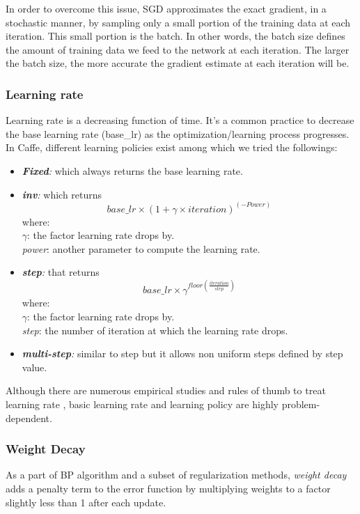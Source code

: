 \indent In order to overcome this issue, SGD approximates the exact gradient, in a stochastic manner, by sampling only a small portion of the training data at each iteration. This small portion is the batch. In other words, the batch size defines the amount of training data we feed to the network at each iteration. The larger the batch size, the more accurate the gradient estimate at each iteration will be. 

\subsubsection{Learning rate}
\label{learning rate}
Learning rate is a decreasing function of time. It's a common practice to decrease the base learning rate (base\_lr) as the optimization/learning process progresses. In Caffe, different learning policies exist among which we tried the followings:
\begin{itemize}
\item \textit{\textbf{Fixed}:} which always returns the base learning rate.
\item \textit{\textbf{inv}:} which returns $$base\_lr \times (1 + \gamma \times iteration) ^ {(-Power)}$$ where:\\\textit{$\gamma$}: the factor learning rate drops by.\\\textit{power}: another parameter to compute the learning rate.

\item \textit{\textbf{step}:} that returns $$base\_lr \times \gamma ^ {floor(\frac{iteration}{step})}$$ where:\\ \textit{$\gamma$}: the factor learning rate drops by.\\\textit{step}: the number of iteration at which the learning rate drops. 
\item \textit{\textbf{multi-step}:} similar to step but it allows non uniform steps defined by step value.
\end{itemize}
Although there are numerous empirical studies and rules of thumb to treat learning rate \cite{senior2013empirical,yu1995dynamic,minai1990acceleration}, basic learning rate and learning policy are highly problem-dependent.  

\subsubsection{Weight Decay}


As a part of BP  algorithm and a subset of regularization methods, \textit{weight decay} adds a penalty term to the error function by multiplying weights to a factor slightly less than 1 after each update. 

